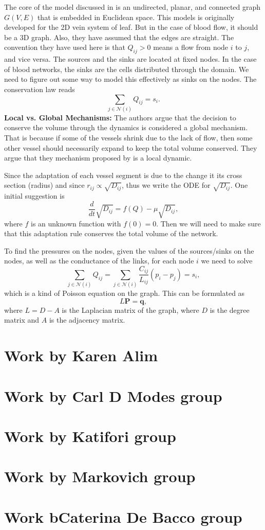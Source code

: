 \documentclass[10pt,a4paper,twocolumn]{article}
\begin{document}
	The core of the model discussed in \cite{Almeida2023} is an undirected, planar, and connected graph $ G(V,E) $ that is embedded in Euclidean space. This models is originally developed for the 2D vein system of leaf. But in the case of blood flow, it should be a 3D graph. Also, they have assumed that the edges are straight. The convention they have used here is that $ Q_{ij}>0 $ means a flow from node $ i $ to $ j $, and vice versa. The sources and the sinks are located at fixed nodes. In the case of blood networks, the sinks are the cells distributed through the domain. We need to figure out some way to model this effectively as sinks on the nodes. The conservation law reads
	\[ \sum_{j\in\mathcal{N}(i)}Q_{ij} = s_i. \]
	\textbf{Local vs. Global Mechanisms:} The authors argue that the decision to conserve the volume through the dynamics is considered a global mechanism. That is because if some of the vessels shrink due to the lack of flow, then some other vessel should necessarily expand to keep the total volume conserved. They argue that they mechanism proposed by \cite{Tero2010} is a local dynamic.
	
	Since the adaptation of each vessel segment is due to the change it its cross section (radius) and since $ r_{ij} \propto \sqrt{D_{ij}} $, thus we write the ODE for $ \sqrt{D_{ij}} $. One initial suggestion is
	\[ \frac{d}{dt} \sqrt{D_{ij}} = f(Q) - \mu \sqrt{D_{ij}},\]
	where $ f $ is an unknown function with $ f(0) = 0 $. Then we will need to make sure that this adaptation rule conserves the total volume of the network.
	
	To find the pressures on the nodes, given the values of the sources/sinks on the nodes, as well as the conductance of the links, for each node $ i $ we need to solve
	\[ \sum_{j\in\mathcal{N}(i)}Q_{ij} = \sum_{j\in\mathcal{N}(i)}\frac{C_{ij}}{L_{ij}}(p_i - p_j) = s_i, \]
	which is a kind of Poisson equation on the graph. This can be formulated as
	\[ L \mathbf{P} = \mathbf{q}, \]
	where $ L = D - A $ is the Laplacian matrix of the graph, where $ D $ is the degree matrix and $ A $ is the adjacency matrix.
	
	
	\newpage
	\section{Work by Karen Alim}
	
	\section{Work by Carl D Modes group}
	
	\section{Work by Katifori group}
	
	\section{Work by Markovich group}
	
	
	\section{Work bCaterina De Bacco group}
	
	\newpage
	
\end{document}
